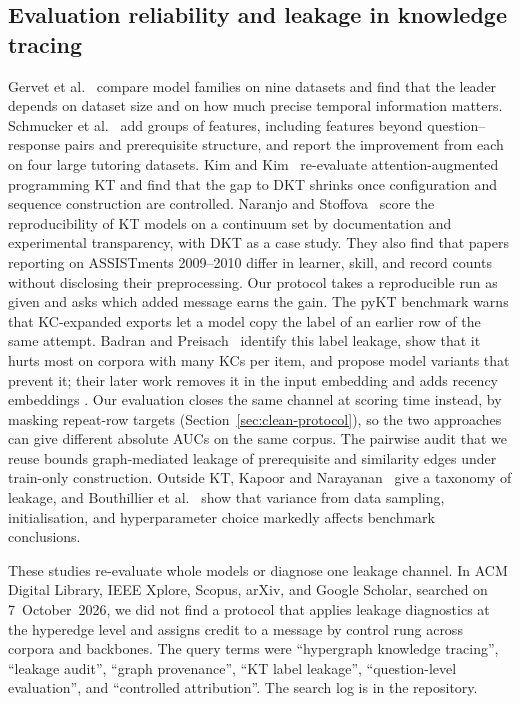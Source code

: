 \documentclass[review,12pt]{elsarticle}
\begin{document}
\subsection{Evaluation reliability and leakage in knowledge tracing}
\label{sec:related-leakage}
Gervet et al.~\cite{gervet2020deepkt} compare model families on nine
datasets and find that the leader depends on dataset size and on how
much precise temporal information matters. Schmucker et
al.~\cite{schmucker2022assessing} add groups of features, including
features beyond question--response pairs and prerequisite structure,
and report the improvement from each on four large tutoring datasets.
Kim and Kim~\cite{kim2026pktreliability} re-evaluate
attention-augmented programming KT and find that the gap to DKT shrinks
once configuration and sequence construction are controlled. Naranjo
and Stoffova~\cite{naranjo2025ktrepro} score the reproducibility of KT
models on a continuum set by documentation and experimental
transparency, with DKT as a case study. They also find that papers
reporting on ASSISTments 2009--2010 differ in learner, skill, and record
counts without disclosing their preprocessing. Our protocol takes a
reproducible run as given and asks which added message earns the gain.
The pyKT benchmark
\cite{liu2022pykt} warns that KC-expanded exports let a model copy the
label of an earlier row of the same attempt. Badran and
Preisach~\cite{badran2025labelleak} identify this label leakage, show
that it hurts most on corpora with many KCs per item, and propose model
variants that prevent it; their later work removes it in the input
embedding and adds recency embeddings \cite{badran2025leakage}. Our
evaluation closes the same channel at scoring time instead, by masking
repeat-row targets (Section~\ref{sec:clean-protocol}), so the two
approaches can give different absolute AUCs on the same corpus. The pairwise audit that we reuse
\cite{daominh2026p0} bounds graph-mediated leakage of prerequisite and
similarity edges under train-only construction. Outside KT, Kapoor and
Narayanan~\cite{kapoor2023leakage} give a taxonomy of leakage, and
Bouthillier et al.~\cite{bouthillier2021variance} show that variance
from data sampling, initialisation, and hyperparameter choice markedly
affects benchmark conclusions.

These studies re-evaluate whole models or diagnose one leakage channel.
In ACM Digital Library, IEEE Xplore, Scopus, arXiv, and Google Scholar,
searched on 7~October~2026, we did not find a protocol that applies
leakage diagnostics at the hyperedge level and assigns credit to a
message by control rung across corpora and backbones. The query terms
were ``hypergraph knowledge tracing'', ``leakage audit'', ``graph
provenance'', ``KT label leakage'', ``question-level evaluation'', and
``controlled attribution''. The search log is in the repository.
\end{document}
